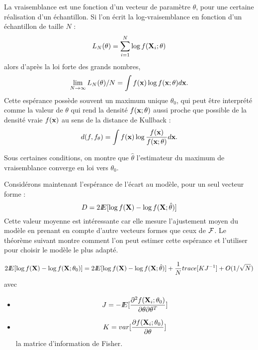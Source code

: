 
La vraisemblance est une fonction d'un vecteur de param\`etre
$\theta$, pour une certaine r\'ealisation d'un \'echantillon.
 Si l'on \'ecrit la log-vraisemblance en 
fonction d'un \'echantillon de taille $N$ :
$$
L_N(\theta)=\sum_{i=1}^N \log f(\mbox{\bf X}_i ; \theta)
$$
alors d'apr\`es la loi forte des grands nombres, 
$$
\lim_{N \rightarrow \infty} L_N(\theta)/N= \int f(\mbox{\bf x}) \log f(\mbox{\bf x} ; \theta) d\mbox{\bf x}.
$$
Cette esp\'erance poss\`ede souvent un maximum unique $\theta_0$,
qui peut \^etre interpr\'et\'e comme la valeur de $\theta$
qui rend la densit\'e $f(\mbox{\bf x} ; \theta)$ aussi proche
que possible de la densit\'e vraie $f(\mbox{\bf x})$ au sens de la distance
de Kullback :
$$
d(f,f_\theta)=\int f(\mbox{\bf x}) \log \frac{f(\mbox{\bf x})}{f(\mbox{\bf x} ; \theta)}d\mbox{\bf x}.
$$

Sous certaines conditions, on montre que $\hat{\theta}$ l'estimateur
du maximum de vraisemblance converge en loi vers  $\theta_0$. 



Consid\'erons maintenant l'esp\'erance de l'\'ecart au mod\`ele, pour
un seul vecteur forme :
$$
D=2 I\!\!E[\log f(\mbox{\bf X}) - \log f(\mbox{\bf X} ; \hat{\theta})]
$$
Cette valeur moyenne est int\'eressante car elle mesure l'ajustement
moyen du mod\`ele en prenant en compte d'autre vecteurs formes que ceux
de ${\cal F}$. Le th\'eor\`eme suivant montre comment l'on peut
estimer cette esp\'erance et l'utiliser pour choisir le mod\`ele
le plus adapt\'e. 

\begin{th}\label{th:penalty}\cite{Ripley1996}
$$
2 I\!\!E[\log f(\mbox{\bf X}) - \log f(\mbox{\bf X} ; \theta_0)]=2 I\!\!E[\log f(\mbox{\bf X}) - \log f(\mbox{\bf X} ; \hat{\theta})] + \frac{1}{N} trace[KJ^{-1}] + O(1/\sqrt{N})
$$
avec 
\begin{itemize}
\item
$$
J=-I\!\!E[\frac{\partial^2 f(\mbox{\bf X}_i ; \theta_0)}{\partial \theta \partial \theta^T}]
$$
\item
$$
K=var[\frac{\partial f(\mbox{\bf X}_i ; \theta_0)}{\partial \theta}]
$$
la matrice d'information de Fisher.
\end{itemize}
\end{th}

